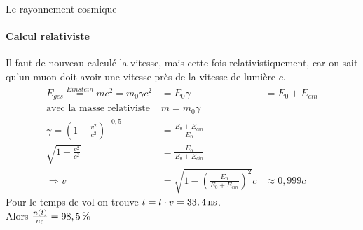 \documentclass[a4paper,11pt,liststotocnumbered,bibtotocnumbered]{scrartcl}
\begin{document}
\begin{section}{Le rayonnement cosmique}
   \paragraph{Calcul relativiste}
   Il faut de nouveau calculé la vitesse, mais cette fois relativistiquement, car on sait qu'un muon doit avoir une vitesse près de la vitesse de lumière $c$. 
   \begin{eqnarray*}
    E_{ges}\stackrel{Einstein}{=}mc^2=m_0\gamma c^2&=E_0\gamma &=E_0+E_{cin}\\
    \text{avec la masse relativiste }&m=m_0\gamma&\\
    \gamma=\left(1-\frac{v^2}{c^2}\right)^{-0,5}&=\frac{E_0+E_{cin}}{E_0}&\\
    \sqrt{1-\frac{v^2}{c^2}}&=\frac{E_0}{E_0+E_{cin}}&\\
    \Rightarrow v&=\sqrt{1-\left(\frac{E_0}{E_0+E_{cin}}\right)^2}c&\approx 0,999c
   \end{eqnarray*}
   Pour le temps de vol on trouve $t=l\cdot v=\unit[33,4]{ns}$.\\
   Alors $\frac{n(t)}{n_0}=\unit[98,5]{\%}$
 \end{section}
\end{document}

